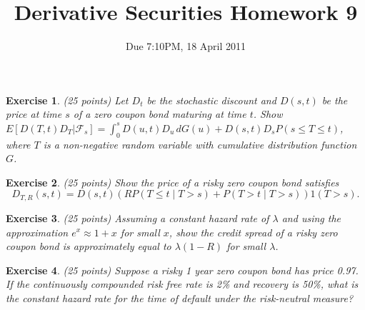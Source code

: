 \documentclass[11pt,fleqn]{amsproc}
\newcommand{\F}{\mathcal{F}}
\newtheorem{xca}{Exercise}
\begin{document}
\title{Derivative Securities Homework 9}
\author{Due 7:10PM, 18 April 2011}

\maketitle


\begin{xca}{(25 points)}
Let $D_t$ be the stochastic discount and $D(s,t)$ be the price at time
$s$ of a zero coupon bond maturing at time $t$.  Show $E[D(T,t)D_T|\F_s]
= \int_0^s D(u,t)D_u\,dG(u) + D(s,t) D_s P(s\le T\le t)$, where $T$ is a
non-negative random variable with cumulative distribution function $G$.

\end{xca}

\begin{xca}{(25 points)}
Show the price of a risky zero coupon bond satisfies
$$D_{T,R}(s, t) = D(s,t)(RP(T\le t\mid T > s)
+ P(T > t\mid T > s))1(T > s).$$
\end{xca}

\begin{xca}{(25 points)}
Assuming a constant hazard rate of $\lambda$ and using the approximation
$e^x \approx 1 + x$ for small $x$, show the credit spread of a risky
zero coupon bond is approximately equal to $\lambda(1 - R)$ for small
$\lambda$.

\end{xca}

\begin{xca}{(25 points)}
Suppose a risky 1 year zero coupon bond has price 0.97. If the continuously
compounded risk free rate is 2\% and recovery is 50\%, what is the
constant hazard rate for the time of default under the risk-neutral 
measure?

\end{xca}
\end{document}
